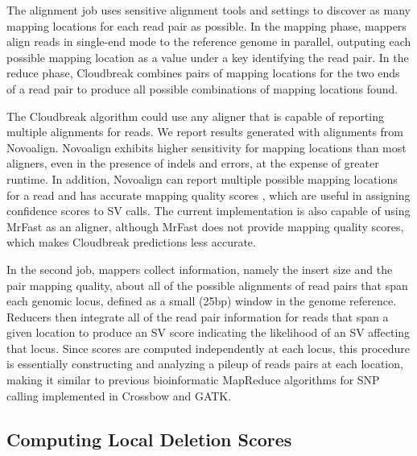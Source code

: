 \documentclass[12pt]{article}
\begin{document}
The alignment job uses sensitive alignment tools and settings to discover as many mapping locations for each read pair as possible. In the mapping phase, mappers align reads in single-end mode to the reference genome in parallel, outputing each possible mapping location as a value under a key identifying the read pair. In the reduce phase, Cloudbreak combines pairs of mapping locations for the two ends of a read pair to produce all possible combinations of mapping locations found. 

The Cloudbreak algorithm could use any aligner that is capable of reporting multiple alignments for reads. We report results generated with alignments from Novoalign. \cite{novoalign} Novoalign exhibits higher sensitivity for mapping locations than most aligners, even in the presence of indels and errors, at the expense of greater runtime. \cite{Krawitz:2010iq} In addition, Novoalign can report multiple possible mapping locations for a read and has accurate mapping quality scores \cite{Ruffalo:2011p1758}, which are useful in assigning confidence scores to SV calls. The current implementation is also capable of using MrFast \cite{Alkan:2009cr} as an aligner, although MrFast does not provide mapping quality scores, which makes Cloudbreak predictions less accurate.

In the second job, mappers collect information, namely the insert size and the pair mapping quality, about all of the possible alignments of read pairs that span each genomic locus, defined as a small (25bp) window in the genome reference. Reducers then integrate all of the read pair information for reads that span a given location to produce an SV score indicating the likelihood of an SV affecting that locus. Since scores are computed independently at each locus, this procedure is essentially constructing and analyzing a pileup of reads pairs at each location, making it similar to previous bioinformatic MapReduce algorithms for SNP calling implemented in Crossbow \cite{Langmead:2009p1225} and GATK. \cite{McKenna:2010p1051}

\subsection{Computing Local Deletion Scores}
\end{document}
